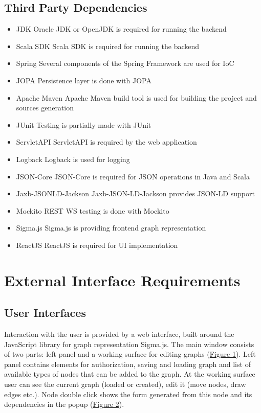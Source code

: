 \documentclass{article}
\begin{document}
\subsection{Third Party Dependencies}
\begin{itemize}
    \item JDK
	Oracle JDK or OpenJDK is required for running the backend
    \item Scala SDK
	Scala SDK is required for running the backend
    \item Spring
	Several components of the Spring Framework are used for IoC
    \item JOPA
	Persistence layer is done with JOPA
    \item Apache Maven
	Apache Maven build tool is used for building the project and sources generation
    \item JUnit
	Testing is partially made with JUnit
    \item ServletAPI
	ServletAPI is required by the web application 
    \item Logback
	Logback is used for logging
    \item JSON-Core
	JSON-Core is required for JSON operations in Java and Scala
    \item Jaxb-JSONLD-Jackson
	Jaxb-JSON-LD-Jackson provides JSON-LD support
    \item Mockito
	REST WS testing is done with Mockito
    \item Sigma.js
	Sigma.js is providing frontend graph representation
    \item ReactJS
	ReactJS is required for UI implementation
\end{itemize}
\section{External Interface Requirements}
\subsection{User Interfaces}
Interaction with the user is provided by a web interface, built around the JavaScript library for graph representation Sigma.js. The main window consists of two parts: left panel and a working surface for editing graphs (\hyperref[pic1]{Figure 1}). Left panel contains elements for authorization, saving and loading graph and list of available types of nodes that can be added to the graph. At the working surface user can see the current graph (loaded or created), edit it (move nodes, draw edges etc.). Node double click shows the form generated from this node and its dependencies in the popup (\hyperref[pic1]{Figure 2}).
\end{document}
